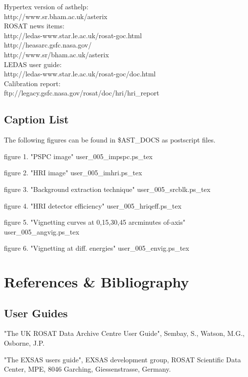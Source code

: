 \documentclass[11pt,fleqn]{article}    %
\begin{document}
Hypertex version of asthelp:\\
  http://www.sr.bham.ac.uk/asterix\\
  
ROSAT news items:\\
  http://ledas-www.star.le.ac.uk/rosat-goc.html\\
  http://heasarc.gsfc.nasa.gov/\\
  http://www.sr/bham.ac.uk/asterix\\
  
LEDAS user guide:\\
  http://ledas-www.star.le.ac.uk/rosat-goc/doc.html\\

Calibration report:\\
  ftp://legacy.gsfc.nasa.gov/rosat/doc/hri/hri\_report\\


\subsection{Caption List}

The following figures can be found in \$AST\_DOCS as postscript files.

figure 1. "PSPC image" user\_005\_impspc.ps\_tex

figure 2. "HRI image" user\_005\_imhri.ps\_tex

figure 3. "Background extraction technique" user\_005\_srcblk.ps\_tex

figure 4. "HRI detector efficiency" user\_005\_hriqeff.ps\_tex

figure 5. "Vignetting curves at 0,15,30,45 arcminutes of-axis" user\_005\_angvig.ps\_tex

figure 6. "Vignetting at diff. energies" user\_005\_envig.ps\_tex

\newpage
\section{References \& Bibliography}

\subsection{User Guides}
"The UK ROSAT Data Archive Centre User Guide", Sembay, S., Watson, M.G.,
Osborne, J.P.

"The EXSAS users guide", EXSAS development group, ROSAT Scientific Data 
Center, MPE, 8046 Garching, Giessenstrasse, Germany.
\end{document}
